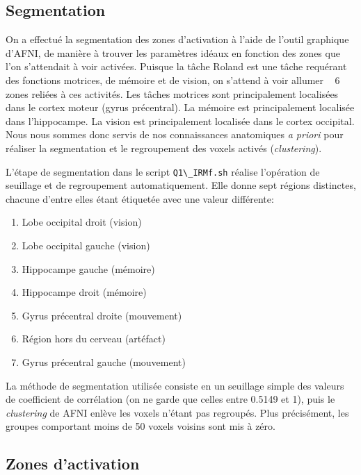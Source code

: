 \documentclass[a4paper]{article}
\begin{document}
\subsection{Segmentation}

On a effectué la segmentation des zones d'activation à l'aide de l'outil graphique d'AFNI, de manière à trouver les paramètres idéaux en fonction des zones que l'on s'attendait à voir activées. Puisque la tâche Roland est une tâche requérant des fonctions motrices, de mémoire et de vision, on s'attend à voir \og allumer \fg~ 6 zones reliées à ces activités. Les tâches motrices sont principalement localisées dans le cortex moteur (gyrus précentral). La mémoire est principalement localisée dans l'hippocampe. La vision est principalement localisée dans le cortex occipital. Nous nous sommes donc servis de nos connaissances anatomiques \emph{a priori} pour réaliser la segmentation et le regroupement des voxels activés (\emph{clustering}).

L'étape de segmentation dans le script \lstinline{Q1\_IRMf.sh} réalise l'opération de seuillage et de regroupement automatiquement. Elle donne sept régions distinctes, chacune d'entre elles étant étiquetée avec une valeur différente:
	
\begin{enumerate}
    \item Lobe occipital droit (vision)
    \item Lobe occipital gauche (vision)
    \item Hippocampe gauche (mémoire)
    \item Hippocampe droit (mémoire)
    \item Gyrus précentral droite (mouvement)
    \item Région hors du cerveau (artéfact)
    \item Gyrus précentral gauche (mouvement)
\end{enumerate}

La méthode de segmentation utilisée consiste en un seuillage simple des valeurs de coefficient de corrélation (on ne garde que celles entre 0.5149 et 1), puis le \emph{clustering} de AFNI enlève les voxels n'étant pas regroupés. Plus précisément, les groupes comportant moins de 50 voxels voisins sont mis à zéro.

\subsection{Zones d'activation}
\end{document}
